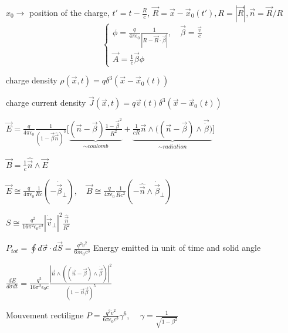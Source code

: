 $x_0 \rightarrow$ position of the charge, $t'=t-\frac{R}{c}$, $\vec{R} = \vec{x}-\vec{x}_0(t'), R=|\vec{R}|, \vec{n} = \vec{R}/R$
\[
    \begin{cases}
        \phi = \frac{q}{4\pi\epsilon_0} \frac{1}{|R-\vec{R}\cdot\vec{\beta}|}, \quad \vec{\beta} = \frac{\vec{v}}{c} \\
        \vec{A} = \frac{1}{c}\vec{\beta} \phi
    \end{cases}
\]
\squishlist
\item charge density $\rho(\vec x,t) = q\delta^{3}(\vec x-\vec x_{0}(t))$
\item charge current density $\vec J(\vec x,t) = q\vec v(t)\delta^{3}(\vec x-\vec x_{0}(t))$
\item $\vec{E} =  \frac{q}{4\pi\epsilon_0} \frac{1}{ (1-\vec{\beta} \hat{\vec{n}})^3} \big[\underbrace{(\vec{n} - \vec{\beta})\frac{1-\vec{\beta}^2}{R^2}}_{\sim coulomb} + \underbrace{\frac{1}{cR}\vec{n}\wedge \big( (\vec{n}-\vec{\beta})\wedge \vec{\dot{\beta}}\big)}_{\sim radiation}\big]$
\item $\vec{B} = \frac{1}{c} \hat{\vec{n}} \wedge \vec{E}$
\squishend

\squishlist
\item $\vec{E} \cong \frac{q}{4\pi\epsilon_0} \frac{1}{Rc} (-\dot{\vec{\beta}}_\perp), \quad \vec{B} \cong \frac{q}{4\pi\epsilon_0} \frac{1}{Rc^2} (-\hat{\vec{n}}\wedge \dot{\vec{\beta}}_\perp)$
\item $S \cong \frac{q^2}{16 \pi^2 \epsilon_0 c^3} |\dot{\vec{v}}_\perp|^2 \frac{\hat{\vec{n}}}{R^2}$
\item $P_{tot} = \oint d\vec{\sigma}\cdot d\vec{S} = \frac{q^2 \dot{v}^2}{6\pi\epsilon_0 c^3}$
\squishend
{}
Energy emitted in unit of time and solid angle %
\squishlist
\item $\frac{dE}{d\sigma dt} = \frac{q^2}{16\pi^2 \epsilon_0 c} \frac{|\vec{n}\wedge ((\vec{n}-\vec{\beta}) \wedge \dot{\vec{\beta}})|^2}{(1-\vec{n}\vec{\beta})^5}$

Mouvement rectiligne
$P = \frac{q^2 \dot{v}^2}{6 \pi \epsilon_0 c^3} \gamma^6$, $\quad \gamma = \frac{1}{\sqrt{1-\beta^2}}$
\squishend
